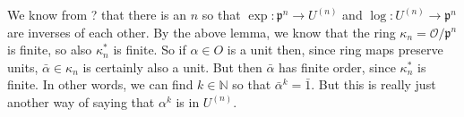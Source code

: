 \documentclass{article}
\newcommand{\mfrak}[1]{\mathfrak{#1}}
\newcommand{\mcal}[1]{\mathcal{#1}}
\newcommand{\mbb}[1]{\mathbb{#1}}
\begin{document}
We know from ? that there is an $n$ so that $\exp : \mfrak p^n \to U^{(n)}$ and $\log : U^{(n)} \to \mfrak p^n$ are inverses of each other. By the above lemma, we know that the ring $\kappa_n = \mcal{O} / \mfrak p^n$ is finite, so also $\kappa_n^*$ is finite. So if $\alpha \in O$ is a unit then, since ring maps preserve units, $\bar \alpha \in \kappa_n$ is certainly also a unit. But then $\bar \alpha$ has finite order, since $\kappa_n^*$ is finite. In other words, we can find $k \in \mbb N$ so that $\bar \alpha^k = \bar 1$. But this is really just another way of saying that $\alpha^k$ is in $U^{(n)}$.
\end{document}
